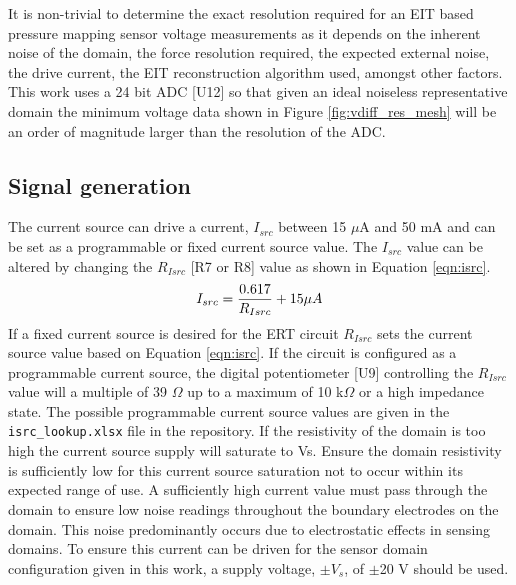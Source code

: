 It is non-trivial to determine the exact resolution required for an EIT based pressure mapping sensor voltage measurements as it depends on the inherent noise of the domain, the force resolution required, the expected external noise, the drive current, the EIT reconstruction algorithm used, amongst other factors. This work uses a 24 bit ADC [U12] so that given an ideal noiseless representative domain the minimum voltage data shown in Figure \ref{fig:vdiff_res_mesh} will be an order of magnitude larger than the resolution of the ADC.


\subsection{Signal generation}
The current source can drive a current, $I_{src}$ between 15 $\mu$A and 50 mA and can be set as a programmable or fixed current source value. The $I_{src}$ value can be altered by changing the $R_{Isrc}$ [R7 or R8] value as shown in Equation \ref{eqn:isrc}.
\begin{equation}
I_{src} = \frac{0.617}{R_{Isrc}} + 15 \space \mu A
\label{eqn:isrc}
\end{equation}
If a fixed current source is desired for the ERT circuit $R_{Isrc}$ sets the current source value based on Equation \ref{eqn:isrc}. If the circuit is configured as a programmable current source, the digital potentiometer [U9] controlling the $R_{Isrc}$ value will a multiple of 39 $\Omega$ up to a maximum of 10 k$\Omega$ or a high impedance state. The possible programmable current source values are given in the \verb|isrc_lookup.xlsx| file in the repository. If the resistivity of the domain is too high the current source supply will saturate to Vs. Ensure the domain resistivity is sufficiently low for this current source saturation not to occur within its expected range of use. 
A sufficiently high current value must pass through the domain to ensure low noise readings throughout the boundary electrodes on the domain. This noise predominantly occurs due to electrostatic effects in sensing domains. To ensure this current can be driven for the sensor domain configuration given in this work, a supply voltage, $\pm V_s$, of $\pm$20 V should be used.


